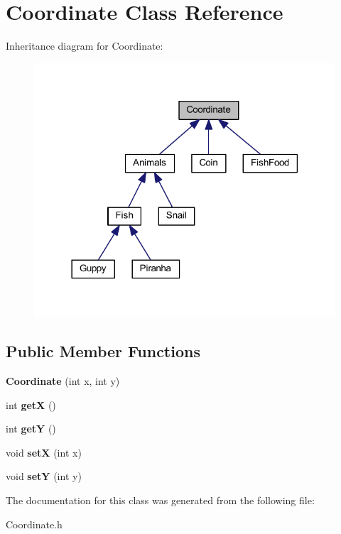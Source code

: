 \hypertarget{class_coordinate}{}\section{Coordinate Class Reference}
\label{class_coordinate}


Inheritance diagram for Coordinate\+:
\nopagebreak
\begin{figure}[H]
\begin{center}
\leavevmode
\includegraphics[width=318pt]{class_coordinate__inherit__graph}
\end{center}
\end{figure}
\subsection*{Public Member Functions}
\begin{DoxyCompactItemize}
\item 
\mbox{\label{class_coordinate_aba3fc03b1a25f335c9058ddf18290d59}} 
{\bfseries Coordinate} (int x, int y)
\item 
\mbox{\label{class_coordinate_ac093fddac8f2c633b1c64b441bbfc6e2}} 
int {\bfseries getX} ()
\item 
\mbox{\label{class_coordinate_aa2972c516f1c636f4f2bfa92042a8ff2}} 
int {\bfseries getY} ()
\item 
\mbox{\label{class_coordinate_ad5dbae717bf274df8b7e13b5640a9472}} 
void {\bfseries setX} (int x)
\item 
\mbox{\label{class_coordinate_a0375bac44bb4d6950e829a3d1560830a}} 
void {\bfseries setY} (int y)
\end{DoxyCompactItemize}


The documentation for this class was generated from the following file\+:\begin{DoxyCompactItemize}
\item 
Coordinate.\+h\end{DoxyCompactItemize}
